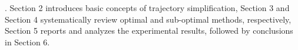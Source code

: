 . Section 2 introduces basic concepts of trajectory simplification,
Section 3 and Section 4 systematically review optimal and sub-optimal \lsa methods, respectively,
Section 5 reports and analyzes the experimental results, followed by
conclusions in Section 6.



